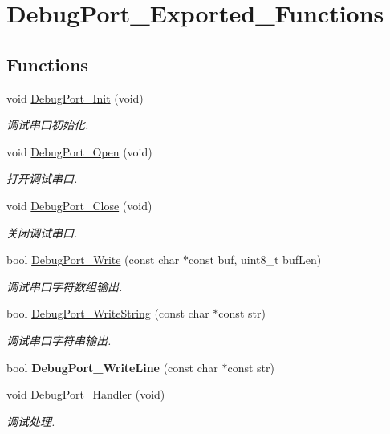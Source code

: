 \hypertarget{group___debug_port___exported___functions}{}\section{Debug\+Port\+\_\+\+Exported\+\_\+\+Functions}
\label{group___debug_port___exported___functions}
\subsection*{Functions}
\begin{DoxyCompactItemize}
\item 
void \hyperlink{group___debug_port___exported___functions_gac8b6f2276832297b953b0df9c9b9c94f}{Debug\+Port\+\_\+\+Init} (void)
\begin{DoxyCompactList}\small\item\em 调试串口初始化. \end{DoxyCompactList}\item 
void \hyperlink{group___debug_port___exported___functions_gaf512b658a5c59c2cf06838a46fb566a6}{Debug\+Port\+\_\+\+Open} (void)
\begin{DoxyCompactList}\small\item\em 打开调试串口. \end{DoxyCompactList}\item 
void \hyperlink{group___debug_port___exported___functions_ga91e73a4824db7761c9fa3eb56307a349}{Debug\+Port\+\_\+\+Close} (void)
\begin{DoxyCompactList}\small\item\em 关闭调试串口. \end{DoxyCompactList}\item 
bool \hyperlink{group___debug_port___exported___functions_ga47bfe409c836aac8085b37893f18a76e}{Debug\+Port\+\_\+\+Write} (const char $\ast$const buf, uint8\+\_\+t buf\+Len)
\begin{DoxyCompactList}\small\item\em 调试串口字符数组输出. \end{DoxyCompactList}\item 
bool \hyperlink{group___debug_port___exported___functions_ga396d54570188cefbe3afdc240b7e9708}{Debug\+Port\+\_\+\+Write\+String} (const char $\ast$const str)
\begin{DoxyCompactList}\small\item\em 调试串口字符串输出. \end{DoxyCompactList}\item 
\mbox{\label{group___debug_port___exported___functions_ga672d3d44714d0edc2170108f91e76aca}} 
bool {\bfseries Debug\+Port\+\_\+\+Write\+Line} (const char $\ast$const str)
\item 
void \hyperlink{group___debug_port___exported___functions_ga8c0e9f2cebd2a8d98f836c9cf85d6d18}{Debug\+Port\+\_\+\+Handler} (void)
\begin{DoxyCompactList}\small\item\em 调试处理. \end{DoxyCompactList}\end{DoxyCompactItemize}


